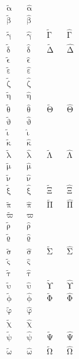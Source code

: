\begin{align*}
  \tilde{\upalpha}    && \hat{\upalpha} \\
  \tilde{\upbeta}     && \hat{\upbeta}  \\
  \tilde{\upgamma}    && \hat{\upgamma} && \tilde{\upGamma} && \hat{\upGamma} \\
  \tilde{\updelta}    && \hat{\updelta} && \tilde{\upDelta} && \hat{\upDelta} \\
  \tilde{\upvarepsilon} &&\hat{\upvarepsilon} \\
  \tilde{\upepsilon}  && \hat{\upepsilon} \\
  \tilde{\upzeta}     && \hat{\upzeta} \\
  \tilde{\upeta}      && \hat{\upeta}  \\
  \tilde{\uptheta}    && \hat{\uptheta} && \tilde{\upTheta} && \hat{\upTheta} \\
  \tilde{\upvartheta} &&\hat{\upvartheta} \\
  \tilde{\upiota}     && \hat{\upiota} \\
  \tilde{\upkappa}    && \hat{\upkappa} \\
  \tilde{\uplambda}   &&\hat{\uplambda} &&\tilde{\upLambda} &&\hat{\upLambda} \\
  \tilde{\upmu}       &&\hat{\upmu} \\
  \tilde{\upnu}       &&\hat{\upnu} \\
  \tilde{\upxi}       &&\hat{\upxi}     &&\tilde{\upXi}     &&\hat{\upXi} \\
  \tilde{\uppi}       &&\hat{\uppi}     &&\tilde{\upPi}     &&\hat{\upPi} \\
  \tilde{\upvarpi}    && \hat{\upvarpi} \\
  \tilde{\uprho}      && \hat{\uprho} \\
  \tilde{\upvarrho}   &&\hat{\upvarrho} \\
  \tilde{\upsigma}    && \hat{\upsigma} && \tilde{\upSigma} && \hat{\upSigma} \\
  \tilde{\upvarsigma} && \hat{\upvarsigma} \\
  \tilde{\uptau}      && \hat{\uptau} \\
  \tilde{\upupsilon}  && \hat{\upupsilon} && \tilde{\upUpsilon} && \hat{\upUpsilon} \\
  \tilde{\upphi}      && \hat{\upphi}   && \tilde{\upPhi} && \hat{\upPhi} \\
  \tilde{\upvarphi}   &&\hat{\upvarphi} \\
  \tilde{\upchi}      && \hat{\upchi} \\
  \tilde{\uppsi}      && \hat{\uppsi}   && \tilde{\upPsi}   && \hat{\upPsi} \\
  \tilde{\upomega}    && \hat{\upomega} && \tilde{\upOmega} && \hat{\upOmega}
\end{align*}
